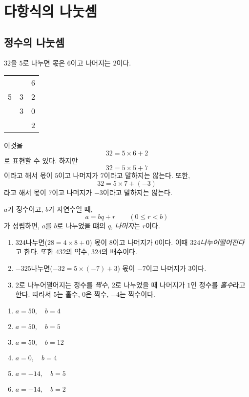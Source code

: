 \documentclass{oblivoir}
\begin{document}
\section{다항식의 나눗셈}

\subsection{정수의 나눗셈}

\exam{}
\(32\)을 \(5\)로 나누면 몫은 \(6\)이고 나머지는 \(2\)이다.
\begin{table}[h!]
\centering
\begin{tabular}{cc@{}c}
&&6\\
\cline{2-3}
5	&\multicolumn{1}{|c}{3}	&2\\
	&3							&0\\
\hline
	&							&2
\end{tabular}
\end{table}

이것을 \[32=5\times6+2\]로 표현할 수 있다.
하지만
\[32=5\times5+7\]
이라고 해서 몫이 \(5\)이고 나머지가 \(7\)이라고 말하지는 않는다.
또한,
\[32=5\times7+(-3)\]
라고 해서 몫이 \(7\)이고 나머지가 \(-3\)이라고 말하지는 않는다.

\begin{mdframed}
%
\(a\)가 정수이고, \(b\)가 자연수일 때,
\[a=bq+r\qquad(0\le r<b)\]
가 성립하면, \(a\)를 \(b\)로 나누었을 떄의  \(q\), \emph{나머지}는 \(r\)이다.
\end{mdframed}

\clearpage
%
\exam{}
\begin{enumerate}[(1)]
\item
\(32\)\를 \(4\) 나누면(\(28=4\times8+0\)) 몫이 \(8\)이고 나머지가 \(0\)이다.
이때 \(32\)\은 \(4\) \emph{나누어떨어진다}고 한다.
또한 \(4\)\는 \(32\)의 약수, \(32\)\은 \(4\)의 배수이다.
\item
\(-32\)\은 \(5\)\로 나누면(\(-32=5\times(-7)+3\)) 몫이 \(-7\)이고 나머지가 \(3\)이다.
\item
\(2\)로 나누어떨어지는 정수를 \emph{짝수}, \(2\)로 나누었을 때 나머지가 \(1\)인 정수를 \emph{홀수}라고 한다.
따라서 \(5\)는 홀수, \(0\)은 짝수, \(-4\)는 짝수이다.
\end{enumerate}

%
\begin{enumerate}[(1)]
\item
\(a=50,\quad b=4\)
\item
\(a=50,\quad b=5\)
\item
\(a=50,\quad b=12\)
\item
\(a=0,\quad b=4\)
\item
\(a=-14,\quad b=5\)
\item
\(a=-14,\quad b=2\)
\end{enumerate}
\end{document}
